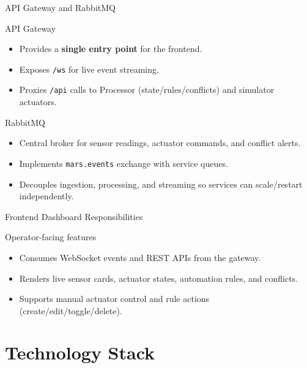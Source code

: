 \documentclass[aspectratio=169]{beamer}
\begin{document}
\begin{frame}[t]{API Gateway and RabbitMQ}
  \begin{block}{API Gateway}
    \begin{itemize}
      \item Provides a \textbf{single entry point} for the frontend.
      \item Exposes \texttt{/ws} for live event streaming.
      \item Proxies \texttt{/api} calls to Processor (state/rules/conflicts) and simulator actuators.
    \end{itemize}
  \end{block}
  \begin{block}{RabbitMQ}
    \begin{itemize}
      \item Central broker for sensor readings, actuator commands, and conflict alerts.
      \item Implements \texttt{mars.events} exchange with service queues.
      \item Decouples ingestion, processing, and streaming so services can scale/restart independently.
    \end{itemize}
  \end{block}
\end{frame}

\begin{frame}[t]{Frontend Dashboard Responsibilities}
  \begin{block}{Operator-facing features}
    \begin{itemize}
      \item Consumes WebSocket events and REST APIs from the gateway.
      \item Renders live sensor cards, actuator states, automation rules, and conflicts.
        \item Supports manual actuator control and rule actions (create/edit/toggle/delete).
    \end{itemize}
  \end{block}
\end{frame}

\section{Technology Stack}
\end{document}
